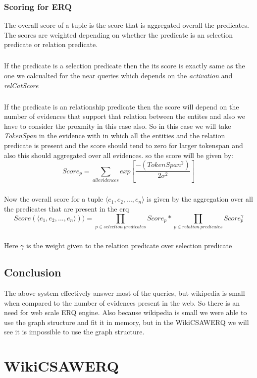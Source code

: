 \documentclass[a4paper,12pt]{report}
\begin{document}
\subsection{Scoring for ERQ}
The overall score of a tuple is the score that is aggregated overall the predicates. The scores are weighted depending on whether the predicate is an selection predicate or relation predicate.
\paragraph*{}
If the predicate is a selection predicate then the its score is exactly same as the one we calcualted for the near queries which depends on the \textit{activation} and \textit{relCatScore}
\paragraph*{}
If the predicate is an relationship predicate then the score will depend on the number of evidences that support that relation between the entites and also we have to consider the proxmity in this case also. So in this case we will take \textit{TokenSpan} in the evidence with in which all the entities and the relation predicate is present and the score should tend to zero for larger tokenspan and also this should aggregated over all evidences. so the score will be given by:
\begin{equation}
 Score_p = \sum_{all evidences} exp[\frac{-(TokenSpan^2)}{2\sigma^2}]
\end{equation}
\paragraph*{}
Now the overall score for a tuple $\langle e_1, e_2,..., e_n \rangle$ is given by the aggregation over all the predicates that are present in the erq
\begin{equation}
Score(\langle e_1, e_2,..., e_n \rangle)) = \prod_{p \in selection\ predicates} Score_p * \prod_{p \in relation\ predicates} Score_p^{\gamma}
\end{equation}
\paragraph*{}
Here $\gamma$ is the weight given to the relation predicate over selection predicate
\section{Conclusion}
The above system effectively answer most of the queries, but wikipedia is small when compared to the number of evidences present in the web. So there is an need for web scale ERQ engine. Also because wikipedia is small we were able to use the graph structure and fit it in memory, but in the WikiCSAWERQ we will see it is impossible to use the graph structure.
\newpage
\chapter{WikiCSAWERQ}             %
\label{wikicsawerq}


\paragraph*{}
\end{document}
